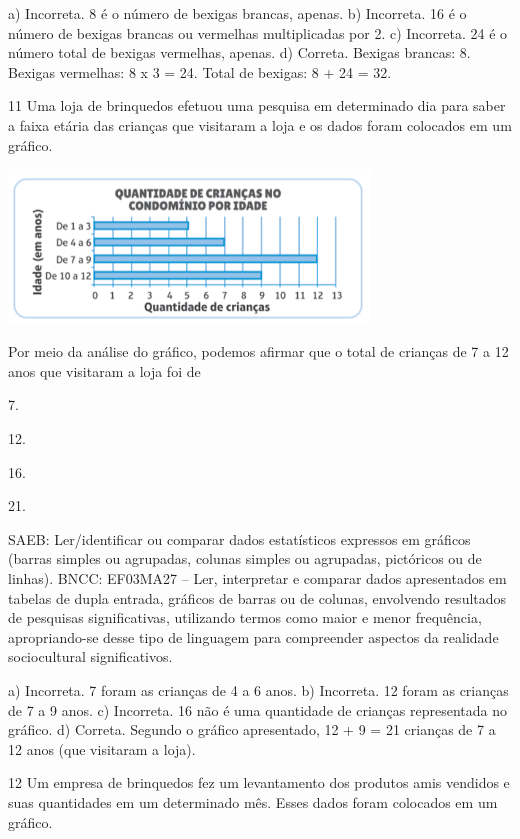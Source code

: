 \begin{multicols}{2}
{\begin{escolha}
{a) Incorreta. 8 é o número de bexigas brancas, apenas.
b) Incorreta. 16 é o número de bexigas brancas ou vermelhas multiplicadas por 2.
c) Incorreta. 24 é o número total de bexigas vermelhas, apenas.
d) Correta. Bexigas brancas: 8. Bexigas vermelhas: 8 x 3 = 24. Total de bexigas: 8 + 24 = 32.

\num{11} Uma loja de brinquedos efetuou uma pesquisa em determinado dia para saber a faixa etária das crianças que visitaram a loja e os dados foram
colocados em um gráfico.


\includegraphics[width=3.77564in,height=1.60972in]{media/image136.png}

Por meio da análise do gráfico, podemos afirmar que o total de crianças de 7 a 12 anos que visitaram a loja foi de

\begin{escolha}

\item
  7.
\item
  12.
\item
  16.
\item
  21.
\end{escolha}

SAEB: Ler/identificar ou comparar dados estatísticos
expressos em gráficos (barras simples ou agrupadas, colunas simples ou agrupadas, pictóricos ou de linhas).
BNCC: EF03MA27 -- Ler, interpretar e comparar dados apresentados em tabelas de dupla entrada,
gráficos de barras ou de colunas, envolvendo resultados de pesquisas significativas, utilizando
termos como maior e menor frequência, apropriando-se desse tipo de linguagem para
compreender aspectos da realidade sociocultural significativos.

a) Incorreta. 7 foram as crianças de 4 a 6 anos.
b) Incorreta. 12 foram as crianças de 7 a 9 anos.
c) Incorreta. 16 não é uma quantidade de crianças representada no gráfico.
d) Correta. Segundo o gráfico apresentado, 12 + 9 = 21 crianças de 7 a 12 anos (que visitaram a loja).

\num{12} Um empresa de brinquedos fez um levantamento dos produtos amis vendidos e suas quantidades em um determinado mês. Esses dados foram colocados em um gráfico.

}
\end{escolha}}
\end{multicols}
